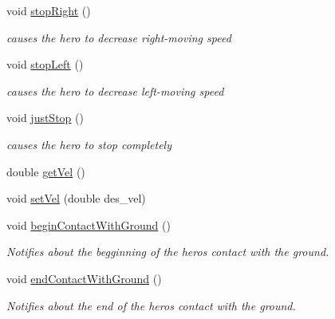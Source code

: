 \begin{DoxyCompactItemize}
\mbox{\label{class_player_afebb6b7ca7210e7b1aa2c9ee4ff75b0e}} 
void \hyperlink{class_player_afebb6b7ca7210e7b1aa2c9ee4ff75b0e}{stop\+Right} ()
\begin{DoxyCompactList}\small\item\em causes the hero to decrease right-\/moving speed \end{DoxyCompactList}\item 
\mbox{\label{class_player_aa150f941486096bb63cc67eabec9046c}} 
void \hyperlink{class_player_aa150f941486096bb63cc67eabec9046c}{stop\+Left} ()
\begin{DoxyCompactList}\small\item\em causes the hero to decrease left-\/moving speed \end{DoxyCompactList}\item 
\mbox{\label{class_player_aaefa871e86a0ae126f3654b1078e0ffa}} 
void \hyperlink{class_player_aaefa871e86a0ae126f3654b1078e0ffa}{just\+Stop} ()
\begin{DoxyCompactList}\small\item\em causes the hero to stop completely \end{DoxyCompactList}\item 
double \hyperlink{class_player_afbabae83ae2b21caf794efa91e26c37d}{get\+Vel} ()
\item 
void \hyperlink{class_player_ade0e4463e66975e549986ce55cac9467}{set\+Vel} (double des\+\_\+vel)
\item 
\mbox{\label{class_player_a35883d3f8b0087209e9f5989fd4142db}} 
void \hyperlink{class_player_a35883d3f8b0087209e9f5989fd4142db}{begin\+Contact\+With\+Ground} ()
\begin{DoxyCompactList}\small\item\em Notifies about the begginning of the hero\textquotesingle{}s contact with the ground. \end{DoxyCompactList}\item 
\mbox{\label{class_player_aadd86e4d822fb07db4a37856506d16e7}} 
void \hyperlink{class_player_aadd86e4d822fb07db4a37856506d16e7}{end\+Contact\+With\+Ground} ()
\begin{DoxyCompactList}\small\item\em Notifies about the end of the hero\textquotesingle{}s contact with the ground. \end{DoxyCompactList}\item 

\end{DoxyCompactItemize}
